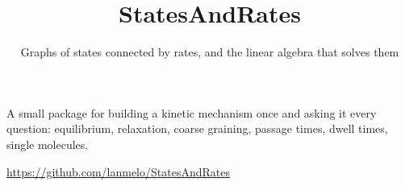 \documentclass[10pt,aspectratio=169]{beamer}
\title{StatesAndRates}
\subtitle{Graphs of states connected by rates, and the linear algebra that
solves them}
\date{}
\begin{document}
{
{
\begin{frame}
  \hypertarget{titleslide}{}%
  \vfill
  \begin{center}
    {\inserttitle\par}
    \vspace{1.0em}
    \begin{minipage}{0.9\textwidth}
      \centering{}\insertsubtitle\par
    \end{minipage}
    \vspace{2.2em}

    \begin{minipage}{0.72\textwidth}
      \centering\small
      A small package for building a kinetic mechanism once and asking it
      every question: equilibrium, relaxation, coarse graining, passage
      times, dwell times, single molecules.
    \end{minipage}

    \vspace{1.8em}
    {\small\url{https://github.com/lanmelo/StatesAndRates}}

  \end{center}
  \vfill
\end{frame}
}
}
\end{document}
